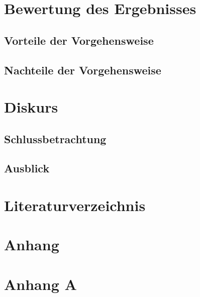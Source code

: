 \documentclass[12pt,oneside]{article}
\begin{document}
\section{Bewertung des Ergebnisses}
\subsection{Vorteile der Vorgehensweise}
\subsection{Nachteile der Vorgehensweise}
\newpage

\section{Diskurs}
\subsection{Schlussbetrachtung}
\subsection{Ausblick}
\newpage 

\section{Literaturverzeichnis}
\clearpage
\lhead{}
\printbibliography
{}
\newpage

\section{Anhang}
\appendix
\section{Anhang A} 





\clearpage

\end{document}
